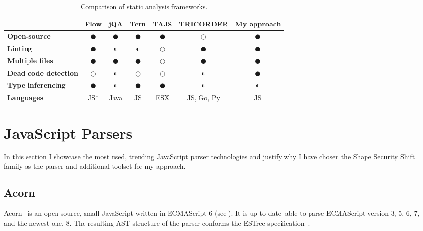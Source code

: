 \vfill
\begin{table}[htbp!]
	\newcommand{\yes}{$\CIRCLE$\xspace}
	\newcommand{\somewhat}{$\LEFTcircle$\xspace}
	\newcommand{\no}{$\Circle$\xspace}
	\centering
	\begin{tabular}{l|ccccc|c}
		\toprule
		                             & \textbf{Flow} & \textbf{jQA} & \textbf{Tern} & \textbf{TAJS} & \textbf{TRICORDER} & \textbf{My approach} \\ \midrule
		\textbf{Open-source}         &     \yes      &   \yes       &     \yes      &     \yes      &        \no         &         \yes         \\
		\textbf{Linting}             &     \yes      &   \somewhat  &     \somewhat &     \no       &        \yes        &         \yes         \\
		\textbf{Multiple files}      &     \yes      &   \yes       &     \yes      &     \no       &        \yes        &         \yes         \\
		\textbf{Dead code detection} &     \no       &   \somewhat  &     \no       &     \no       &        \somewhat   &         \yes         \\
		\textbf{Type inferencing}    &     \yes      &   \somewhat  &     \yes      &     \yes      &        \somewhat   &         \somewhat    \\
		\textbf{Languages}           &      JS*      &   Java       &      JS       &      ESX      &     JS, Go, Py     &          JS          \\ \bottomrule
	\end{tabular}

	\caption{Comparison of static analysis frameworks.}
	\label{table:comparison-of-frameworks}
\end{table}
\vfill
\clearpage


\section{JavaScript Parsers}
\label{sect:javascript-parsers}
In this section I showcase the most used, trending JavaScript parser technologies and justify why I have chosen the Shape Security Shift family as the parser and additional toolset for my approach.

\subsection{Acorn}
\label{sect:acorn}
Acorn~\cite{acorn} is an open-source, small JavaScript written in ECMAScript 6 (see ). It is up-to-date, able to parse ECMAScript version 3, 5, 6, 7, and the newest one, 8. The resulting AST structure of the parser conforms the ESTree specification~\cite{estree}.

